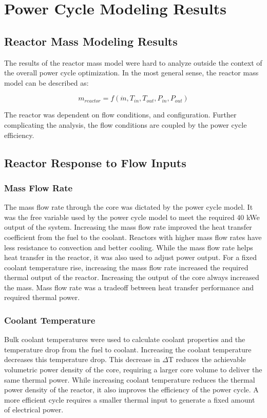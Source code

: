 \chapter{Power Cycle Modeling Results}\label{ch:power_cycle_results}

\section{Reactor Mass Modeling Results}
The results of the reactor mass model were hard to analyze outside the context of
the overall power cycle optimization. In the most general sense, the reactor
mass model can be described as:

\begin{equation}
    m_{reactor} = f(\dot{m}, T_{in}, T_{out}, P_{in}, P_{out})
\end{equation}

The reactor was dependent on flow conditions, and configuration. Further
complicating the analysis, the flow conditions are coupled by the power cycle
efficiency.

\section{Reactor Response to Flow Inputs}

\subsection{Mass Flow Rate}
The mass flow rate through the core was dictated by the power cycle model. It was
the free variable used by the power cycle model to meet the required 40 kWe
output of the system. Increasing the mass flow rate improved the heat transfer
coefficient from the fuel to the coolant. Reactors with higher mass flow rates
have less resistance to convection and better cooling. While the mass flow rate
helps heat transfer in the reactor, it was also used to adjust power output. For
a fixed coolant temperature rise, increasing the mass flow rate increased the
required thermal output of the reactor. Increasing the output of the core always
increased the mass. Mass flow rate was a tradeoff between heat transfer
performance and required thermal power.

\subsection{Coolant Temperature}
Bulk coolant temperatures were used to calculate coolant properties and the
temperature drop from the fuel to coolant. Increasing the coolant temperature
decreases this temperature drop. This decrease in $\Delta$T reduces the
achievable volumetric power density of the core, requiring a larger core volume to deliver the same
thermal power. While increasing coolant temperature reduces the thermal power
density of the reactor, it also improves the efficiency of the power cycle. A
more efficient cycle requires a smaller thermal input to generate a fixed amount
of electrical power.

